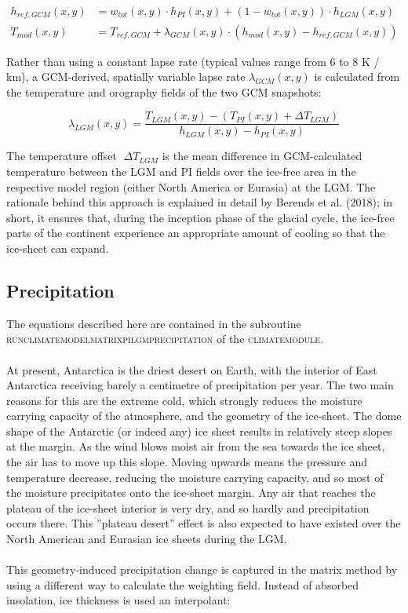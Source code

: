 \documentclass{article}
\begin{document}
\begin{align}
h_{ref,GCM}(x,y) &= w_{tot} (x,y) \cdot h_{PI} (x,y) + \left( 1 - w_{tot} (x,y) \right) \cdot h_{LGM} (x,y)\\
T_{mod} (x,y) &= T_{ref,GCM} + \lambda_{GCM} (x,y) \cdot \left( h_{mod} (x,y) - h_{ref,GCM} (x,y) \right)
\end{align}

Rather than using a constant lapse rate (typical values range from 6 to 8 K / km), a GCM-derived, spatially variable lapse rate $\lambda_{GCM} (x,y)$ is calculated from the temperature and orography fields of the two GCM snapshots:

\begin{equation}
\lambda_{LGM} (x,y) = \frac{T_{LGM}(x,y) - \left( T_{PI} (x,y) + \Delta T_{LGM} \right) }{h_{LGM} (x,y) - h_{PI} (x,y)}
\end{equation}

The temperature offset $􏰀\Delta T_{LGM}$ is the mean difference in GCM-calculated temperature between the LGM and PI fields over the ice-free area in the respective model region (either North America or Eurasia) at the LGM. The rationale behind this approach is explained in detail by Berends et al. (2018); in short, it ensures that, during the inception phase of the glacial cycle, the ice-free parts of the continent experience an appropriate amount of cooling so that the ice-sheet can expand.\\

\subsection{Precipitation}

The equations described here are contained in the subroutine \textsc{run\textunderscore climate\textunderscore model\textunderscore matrix\textunderscore pi\textunderscore lgm\textunderscore precipitation} of the \textsc{climate\textunderscore module}.\\
\\
At present, Antarctica is the driest desert on Earth, with the interior of East Antarctica receiving barely a centimetre of precipitation per year. The two main reasons for this are the extreme cold, which strongly reduces the moisture carrying capacity of the atmosphere, and the geometry of the ice-sheet. The dome shape of the Antarctic (or indeed any) ice sheet results in relatively steep slopes at the margin. As the wind blows moist air from the sea towards the ice sheet, the air has to move up this slope. Moving upwards means the pressure and temperature decrease, reducing the moisture carrying capacity, and so most of the moisture precipitates onto the ice-sheet margin. Any air that reaches the plateau of the ice-sheet interior is very dry, and so hardly and precipitation occurs there. This ''plateau desert'' effect is also expected to have existed over the North American and Eurasian ice sheets during the LGM.\\
\\
This geometry-induced precipitation change is captured in the matrix method by using a different way to calculate the weighting field. Instead of absorbed insolation, ice thickness is used an interpolant:
\end{document}
